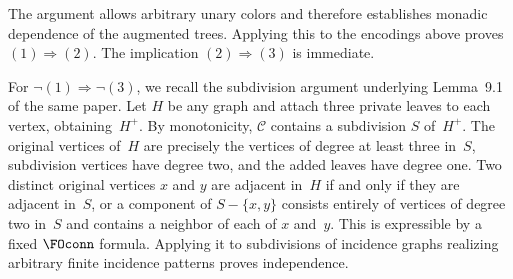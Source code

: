 \documentclass[1p,number,11pt]{elsarticle}
\theoremstyle{plain}
\newcommand{\Cc}{\mathscr{C}}
\begin{document}
The argument allows arbitrary unary colors and therefore establishes monadic dependence of the augmented trees. 
Applying this to the encodings above proves $(1)\Rightarrow(2)$. 
The implication $(2)\Rightarrow(3)$ is immediate.

For $\neg(1)\Rightarrow\neg(3)$, we recall the subdivision argument underlying Lemma~9.1 of the same paper. 
Let $H$ be any graph and attach three private leaves to each vertex, obtaining~$H^+$. By monotonicity, $\Cc$ contains a subdivision $S$ of~$H^+$. The original vertices of~$H$ are precisely the vertices of degree at least three in~$S$, subdivision vertices have degree two, and the added leaves have degree one. 
Two distinct original vertices $x$ and $y$ are adjacent in~$H$ if and only if they are adjacent in~$S$, or a component of $S-\{x,y\}$ consists entirely of vertices of degree two in~$S$ and contains a neighbor of each of $x$ and~$y$. 
This is expressible by a fixed $\FOconn$ formula. 
Applying it to subdivisions of incidence graphs realizing arbitrary finite incidence patterns proves independence.
\end{document}
